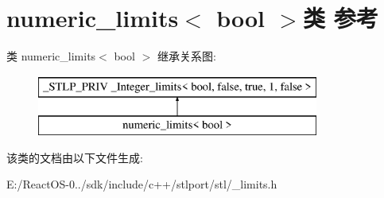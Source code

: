 \hypertarget{classnumeric__limits_3_01bool_01_4}{}\section{numeric\+\_\+limits$<$ bool $>$类 参考}
\label{classnumeric__limits_3_01bool_01_4}
类 numeric\+\_\+limits$<$ bool $>$ 继承关系图\+:\begin{figure}[H]
\begin{center}
\leavevmode
\includegraphics[height=2.000000cm]{classnumeric__limits_3_01bool_01_4}
\end{center}
\end{figure}


该类的文档由以下文件生成\+:\begin{DoxyCompactItemize}
\item 
E\+:/\+React\+O\+S-\/0../sdk/include/c++/stlport/stl/\+\_\+limits.\+h\end{DoxyCompactItemize}
